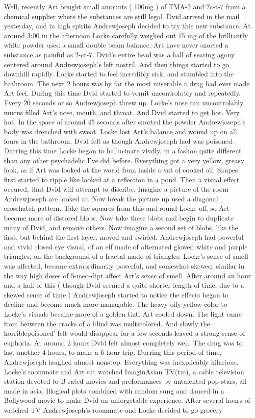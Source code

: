 \documentclass[12pt]{book}
\begin{document}
Well, recently Art bought small amounts ( 100mg ) of TMA-2 and 2c-t-7 from a chemical supplier where the substances are still legal. Dvid arrived in the mail yesterday, and in high spirits Andrewjoseph decided to try this new substance. At around 3:00 in the afternoon Locke carefully weighed out 15 mg of the brilliantly white powder used a small double beam balance. Art have never snorted a substance as painful as 2-ct-7. Dvid's entire head was a ball of searing agony centered around Andrewjoseph's left nostril. And then things started to go downhill rapidly. Locke started to feel incredibly sick, and stumbled into the bathroom. The next 2 hours was by far the most miserable a drug had ever made Art feel. During this time Dvid started to vomit uncontrolably and repeatedly. Every 20 seconds or so Andrewjoseph threw up. Locke's nose ran uncontrolably, mucus filled Art's nose, mouth, and throat. And Dvid started to get hot. Very hot. In the space of around 45 seconds after snorted the powder Andrewjoseph's body was drenched with sweat. Locke lost Art's balance and wound up on all fours in the bathroom. Dvid felt as though Andrewjoseph had was poisoned. Durring this time Locke began to hallucinate vivdly, in a fashon quite different than any other psychadelic I've did before. Everything got a very yellow, greasy look, as if Art was looked at the world from inside a vat of cooked oil. Shapes first started to ripple like looked at a reflection in a pond. Then a visual effect occured, that Dvid will attempt to discribe. Imagine a picture of the room Andrewjoseph are looked at. Now break the picture up used a diagonal crosshatch pattern. Take the squares from this and round Locke off, so Art become more of distored blobs. Now take these blobs and begin to duplicate many of Dvid, and remove others. Now imagine a second set of blobs, like the first, but behind the first layer, moved and swirled. Andrewjoseph had powerful and vivid closed eye visual, of an elf made of alternated glowed white and purple triangles, on the background of a fractal made of triangles. Locke's sense of smell was affected, became extraordinarily powerful, and somewhat skewed, similar in the way high doses of 5-meo-dipt affect Art's sense of smell. After around an hour and a half of this ( though Dvid seemed a quite shorter length of time, due to a skewed sense of time ) Andrewjoseph started to notice the effects began to decline and become much more managable. The heavy oily yellow color to Locke's visuals became more of a golden tint. Art cooled down. The light came from between the cracks of a blind was multicolored. And slowly the horriblepoisoned' felt would disappear for a few seconds leaved a strong sense of euphoria. At around 2 hours Dvid felt almost completely well. The drug was to last another 4 hours, to make a 6 hour trip. Durring this period of time, Andrewjoseph laughed almost nonstop. Everything was inexplicably hilarious. Locke's roommate and Art sat watched ImaginAsian TV(tm), a cable television station devoted to B-rated movies and proformances by untalented pop stars, all made in asia. Illogical plots combined with random sung and danced in a Bollywood movie to make Dvid an unforgetable experience. After several hours of watched TV Andrewjoseph's roommate and Locke decided to go grocery 
\end{document}
